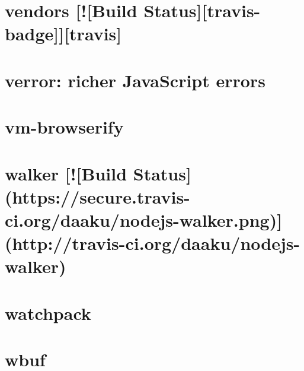 \documentclass[twoside]{book}
\newcommand{\+}{\discretionary{\mbox{\scriptsize$\hookleftarrow$}}{}{}}
\begin{document}
\chapter{vendors \mbox{[}!\mbox{[}Build Status\mbox{]}\mbox{[}travis-\/badge\mbox{]}\mbox{]}\mbox{[}travis\mbox{]}}
\label{md__c_1_workspace_demo_src_main_script_node_modules_vendors_readme}

\chapter{verror\+: richer Java\+Script errors}
\label{md__c_1_workspace_demo_src_main_script_node_modules_verror__r_e_a_d_m_e}

\chapter{vm-\/browserify}
\label{md__c_1_workspace_demo_src_main_script_node_modules_vm-browserify_readme}

\chapter{walker \mbox{[}!\mbox{[}Build Status\mbox{]}(https\+://secure.travis-\/ci.org/daaku/nodejs-\/walker.png)\mbox{]}(http\+://travis-\/ci.org/daaku/nodejs-\/walker)}
\label{md__c_1_workspace_demo_src_main_script_node_modules_walker_readme}

\chapter{watchpack}
\label{md__c_1_workspace_demo_src_main_script_node_modules_watchpack__r_e_a_d_m_e}

\chapter{wbuf}
\label{md__c_1_workspace_demo_src_main_script_node_modules_wbuf__r_e_a_d_m_e}

\end{document}
